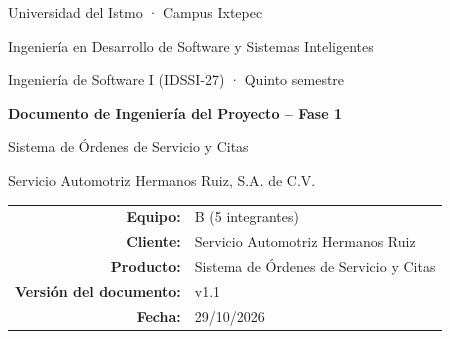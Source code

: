 \newcommand{\versiondoc}{1.1}
\newcommand{\fechadoc}{29/10/2026}




\begin{titlepage}
\centering
{\large Universidad del Istmo · Campus Ixtepec\par}
Ingeniería en Desarrollo de Software y Sistemas Inteligentes\par
Ingeniería de Software I (IDSSI-27) · Quinto semestre\par
\vspace{3cm}
{\LARGE\bfseries Documento de Ingeniería del Proyecto -- Fase 1\par}
\vspace{1cm}
{\Large Sistema de Órdenes de Servicio y Citas\par}
\vspace{0.5cm}
Servicio Automotriz Hermanos Ruiz, S.A. de C.V.\par
\vfill
\begin{tabular}{rl}
\textbf{Equipo:} & B (5 integrantes)\\
\textbf{Cliente:} & Servicio Automotriz Hermanos Ruiz\\
\textbf{Producto:} & Sistema de Órdenes de Servicio y Citas\\
\textbf{Versión del documento:} & v\versiondoc\\
\textbf{Fecha:} & \fechadoc\\
\end{tabular}
\end{titlepage}

\tableofcontents
\clearpage





















